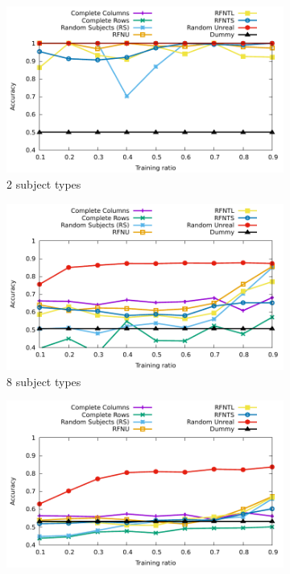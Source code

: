 \documentclass[10pt, conference, compsocconf]{IEEEtran}
\begin{document}
\begin{figure}
\centering
\begin{subfigure}[b]{0.3\textwidth}
        \includegraphics[width=\textwidth]{data/results/means_of_results/ALS-Bias/Synthetic/synthetic_subject_types/ALS-Bias-2-types.pdf}
        \caption{2 subject types}
\end{subfigure}
\hfill
\begin{subfigure}[b]{0.3\textwidth}
        \includegraphics[width=\textwidth]{data/results/means_of_results/ALS-Bias/Synthetic/synthetic_subject_types/ALS-Bias-8-types.pdf}
        \caption{8 subject types}
\end{subfigure}
\hfill
\begin{subfigure}[b]{0.3\textwidth}
        \includegraphics[width=\textwidth]{data/results/means_of_results/ALS-Bias/Synthetic/synthetic_subject_types/ALS-Bias-64-types.pdf}

\end{subfigure}
\end{figure}
\end{document}
